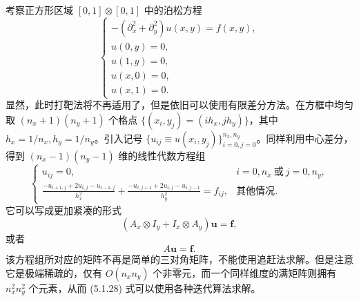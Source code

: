 考察正方形区域 $[0,1]\otimes[0,1]$ 中的泊松方程
\begin{equation}
\begin{cases}
-(\partial_x^2+\partial_y^2)u(x,y)=f(x,y),\\
u(0,y)=0,\\
u(1,y)=0,\\
u(x,0)=0,\\
u(x,1)=0.
\end{cases}
\tag{5.1.25}
\end{equation}
显然，此时打靶法将不再适用了，但是依旧可以使用有限差分方法。在方框中均匀取 $(n_x+1)(n_y+1)$ 个格点 $\{(x_i,y_j)=(ih_x,jh_y)\}$，其中 $h_x=1/n_x,h_y=1/n_y$。引入记号 $\{u_{ij}\equiv u(x_i,y_j)\}_{i=0,j=0}^{n_x,n_y}$。同样利用中心差分，得到 $(n_x-1)(n_y-1)$ 维的线性代数方程组
\begin{equation}
\begin{cases}
u_{ij}=0,&i=0,n_x\ \text{或}\ j=0,n_y,\\[4pt]
\displaystyle
\frac{-u_{i+1,j}+2u_{i,j}-u_{i-1,j}}{h_x^2}
+\frac{-u_{i,j+1}+2u_{i,j}-u_{i,j-1}}{h_y^2}=f_{ij},&\text{其他情况}.
\end{cases}
\tag{5.1.26}
\end{equation}
它可以写成更加紧凑的形式
\begin{equation}
(A_x\otimes I_y+I_x\otimes A_y)\bm u=\bm f,
\tag{5.1.27}
\end{equation}
或者
\begin{equation}
A\bm u=\bm f.
\tag{5.1.28}
\end{equation}
该方程组所对应的矩阵不再是简单的三对角矩阵，不能使用追赶法求解。但是注意它是极端稀疏的，仅有 $O(n_xn_y)$ 个非零元，而一个同样维度的满矩阵则拥有 $n_x^2n_y^2$ 个元素，从而 (5.1.28) 式可以使用各种迭代算法求解。

